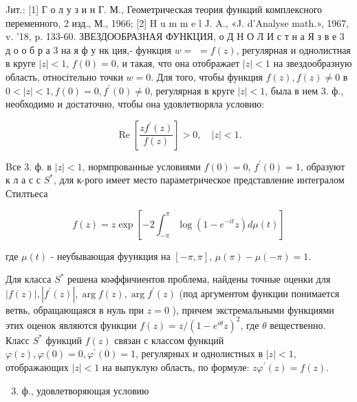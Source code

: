 \documentclass[10pt]{article}
\begin{document}
Jит.: [1] Г о л у з и н Г. М., Геометрическая теория функций комплексного переменного, 2 изд., М., 1966; [2] H u m m e l J. A., «J. d'Analyse math.», 1967, v. '18, p. 133-60. ЗВЕЗДООБРАЗНАЯ ФУНКЦИЯ, о Д Н О Л И с т н а Я з в е 3 д о о б р а 3 на я ф у нк ция,- функция $w=$ $=f(z)$, регулярная и однолистная в круге $|z|<1$, $f(0)=0$, и такая, что она отображает $|z|<1$ на звездообразную область, относітельно точки $w=0$. Для того, чтобы функция $f(z), f(z) \neq 0$ в $0<|z|<1, f(0)=0, f^{\prime}(0) \neq 0$, регулярная в круге $|z|<1$, была в нем 3. ф., необходимо и достаточно, чтобы она удовлетворяла условию:



\[

\operatorname{Re}\left[\frac{z f^{\prime}(z)}{f(z)}\right]>0, \quad|z|<1 .

\]



Bсе 3. ф. в $|z|<1$, нормпрованные условиями $f(0)=0$, $f^{\prime}(0)=1$, образуют к л а с с $S^{*}$, для к-рого имеет место параметрическое представление интегралом Стилтьеса



\[

f(z)=z \exp \left[-2 \int_{-\pi}^{\pi} \log \left(1-e^{-i t} z\right) d \mu(t)\right]

\]



где $\mu(t)$ - неубывающая фуункция на $[-\pi, \pi]$, $\mu(\pi)-\mu(-\pi)=1$.



Для класса $S^{*}$ решена коәффичиентов проблема, найдены точные оценки для $|f(z)|,\left|f^{\prime}(z)\right|, \arg f(z), \arg f^{\prime}(z)$ (под аргументом функции понимается ветвь, обращающаяся в нуль при $z=0$ ), причем экстремальными функциями этих оценок являются функции $f(z)=z /\left(1-e^{i \theta} z\right)^{2}$, где $\theta$ вещественно. Класс $S^{*}$ функций $f(z)$ связан с классом функций $\varphi(z), \varphi(0)=0, \varphi^{\prime}(0)=1$, регулярных и однолистных в $|z|<1$, отображающих $|z|<1$ на выпуклую область, по формуле: $z \varphi^{\prime}(z)=f(z)$.



\begin{enumerate}

  \setcounter{enumi}{2}

  \item ф., удовлетворяющая условию

\end{enumerate}
\end{document}
